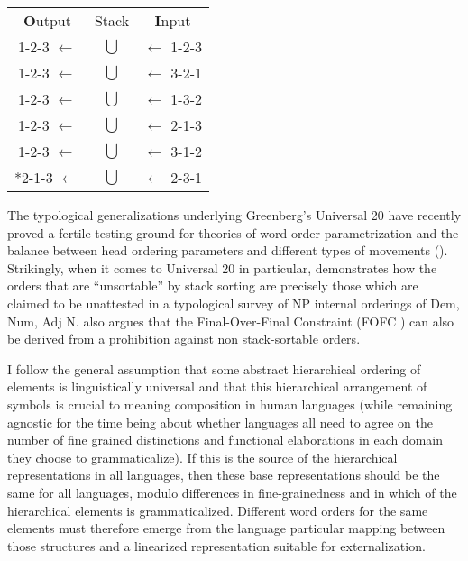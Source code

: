 \documentclass[output=paper,colorlinks,citecolor=brown]{langscibook}
\begin{document}
\ea
\begin{tabular}{ccc}
{\textbf Output} & Stack & {\textbf Input} \\
1-2-3 $\longleftarrow$ & $\bigcup$ & $\longleftarrow$ 1-2-3 \\
1-2-3 $\longleftarrow$ & $\bigcup$ & $\longleftarrow$ 3-2-1 \\
1-2-3 $\longleftarrow$ & $\bigcup$ & $\longleftarrow$ 1-3-2 \\
1-2-3 $\longleftarrow$ & $\bigcup$ & $\longleftarrow$ 2-1-3 \\
1-2-3 $\longleftarrow$ & $\bigcup$ & $\longleftarrow$ 3-1-2 \\
{*}2-1-3 $\longleftarrow$ & $\bigcup$ & $\longleftarrow$ 2-3-1 \\
\end{tabular}
\z

The typological generalizations underlying Greenberg's Universal 20 have recently proved a fertile testing ground for theories of word order parametrization and the balance between head ordering parameters and different types of movements (\citealt{cinque17, abelsneeleman09}). 
Strikingly, when it comes to Universal 20 in particular, \citet{medeiros24} demonstrates  how the orders that are “unsortable”  by stack sorting are precisely those which are claimed to be unattested in a typological survey of NP internal orderings of Dem, Num, Adj N. \citet{medeiros24} also argues that the Final\hyp Over\hyp Final Constraint (FOFC \citealt{biberaueretal07}) can also be derived from a prohibition against non stack-sortable orders. 

I follow the general assumption that some abstract hierarchical ordering of elements is linguistically universal and that this hierarchical arrangement of symbols is crucial to meaning composition in human languages (while remaining agnostic for the time being about whether languages all need to agree on the number of fine grained distinctions and functional elaborations in each domain they choose to grammaticalize).  If this is the source of the hierarchical representations in all languages, then these base representations should be the same for all languages,  modulo differences in fine-grainedness and in which of the hierarchical elements is grammaticalized. Different word orders for the same elements must therefore emerge from the language particular mapping between those structures and a linearized representation suitable for externalization.  
\end{document}
